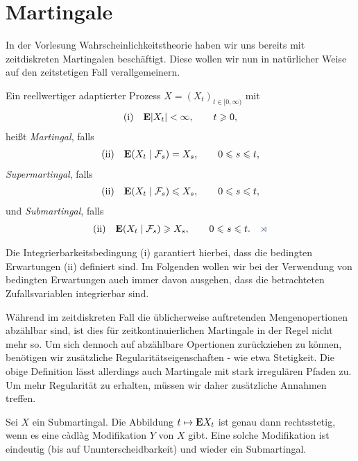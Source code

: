 \section{Martingale}

In der Vorlesung Wahrscheinlichkeitstheorie haben wir uns bereits mit
zeitdiskreten Martingalen beschäftigt. Diese wollen wir nun in natürlicher
Weise auf den zeitstetigen Fall verallgemeinern.

\begin{defn}
\label{defn:1.8}
Ein reellwertiger adaptierter Prozess $X=(X_t)_{t\in[0,\infty)}$ mit
\begin{align*}
\text{(i)}\quad \mathbf{E} \lvert X_t\rvert < \infty,\qquad t\geqslant 0,
\end{align*}
heißt \emph{Martingal}, falls
\begin{align*}
\text{(ii)}\quad \mathbf{E}(X_t\mid \mathcal{F}_s) = X_s,\qquad 0\leqslant s\leqslant t,
\end{align*}
\emph{Supermartingal}, falls
\begin{align*}
\text{(ii)}\quad \mathbf{E}(X_t\mid \mathcal{F}_s) \leqslant X_s,\qquad 0\leqslant s\leqslant t,
\end{align*}
und \emph{Submartingal}, falls
\begin{align*}
\text{(ii)}\quad \E(X_t\mid \FF_s) \ge X_s,\qquad 0\le s\le t.\fish
\end{align*}
\end{defn}

Die Integrierbarkeitsbedingung (i) garantiert hierbei, dass die bedingten
Erwartungen (ii) definiert sind. Im Folgenden wollen wir bei der Verwendung von
bedingten Erwartungen auch immer davon ausgehen, dass die betrachteten
Zufallsvariablen integrierbar sind.

Während im zeitdiskreten Fall die üblicherweise auftretenden Mengenopertionen
abzählbar sind, ist dies für  zeitkontinuierlichen Martingale in der Regel
nicht mehr so. Um sich dennoch auf abzählbare Opertionen zurückziehen zu
können, benötigen wir zusätzliche Regularitätseigenschaften - wie etwa
Stetigkeit. Die obige Definition lässt allerdings auch Martingale mit stark
irregulären Pfaden zu. Um mehr Regularität zu erhalten, müssen wir daher
zusätzliche Annahmen treffen.

\begin{prop}
\label{prop:1.6}
Sei $X$ ein Submartingal. Die Abbildung $t\mapsto \mathbf{E} X_t$ ist genau dann
rechtsstetig, wenn es eine càdlàg Modifikation $Y$ von $X$ gibt. Eine solche
Modifikation ist eindeutig (bis auf Ununterscheidbarkeit) und wieder ein
Submartingal.\fish
\end{prop}

